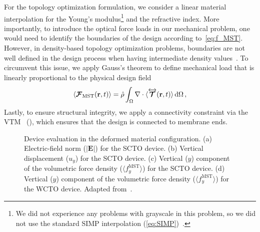  For the topology optimization formulation, we consider a linear material interpolation for the Young's modulus\footnote{We did not experience any problems with grayscale in this problem, so we did not use the standard SIMP interpolation (\eqref{eq:SIMP})~\cite{SIMP}.} and the 
 refractive index. More importantly, to introduce the optical force loads in our mechanical problem, one would need to identify the boundaries of the design according to~\eqref{eq:f_MST}. However, in density-based topology optimization problems, boundaries
 are not well defined in the design process when having intermediate density values~\cite{jdara}. To circumvent this issue, we apply Gauss's theorem to
 define mechanical load that is linearly proportional to the physical design field
    \begin{equation}
 \langle \bm{\mathcal{F}}_\text{MST}(\mathbf{r},t) \rangle = \hat{\rho} \int_\Omega \nabla \cdot \langle\overleftrightarrow{\bm{\mathcal{T}}}(\mathbf{r}, t)\rangle \mathop{}\!\text{d}\Omega \,,
    \end{equation}
Lastly, to ensure structural integrity, we apply a connectivity constraint via the VTM~\cite{li_structural_2016} (), which ensures that the design is connected to membrane ends. 

\begin{figure}[tb]
    \centering
    \caption{Device evaluation in the deformed material configuration. (a) Electric-field norm ($\vert\mathbf{E}\vert$) for the SCTO device. (b) Vertical displacement ($u_y$) for the SCTO device.
     (c) Vertical ($y$) component of the volumetric force density ($\langle f^\text{MST}_y\rangle$) for the SCTO device. (d) Vertical ($y$) component of
      the volumetric force density ($\langle f^\text{MST}_y\rangle$) for the WCTO device. Adapted from~\cite{ownpub5}.}
    \label{fig:SC}
\end{figure}


